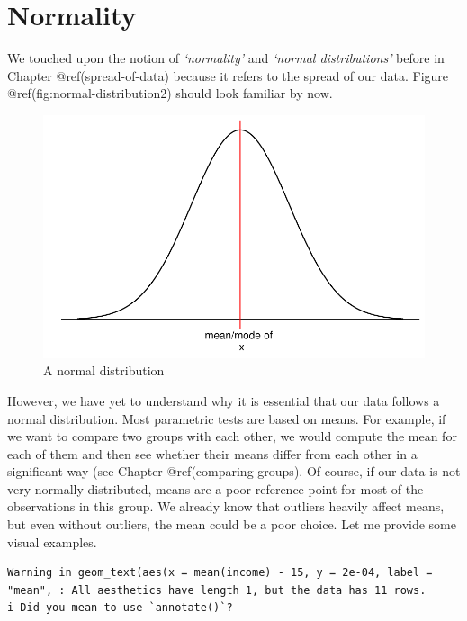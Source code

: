 \documentclass[
  letterpaper,
]{krantz}
\begin{document}
\section{Normality}\label{sec-normality}

We touched upon the notion of \emph{`normality'} and \emph{`normal
distributions'} before in Chapter @ref(spread-of-data) because it refers
to the spread of our data. Figure @ref(fig:normal-distribution2) should
look familiar by now.

\begin{figure}[H]

{\centering \includegraphics{09_sources_of_bias_files/figure-pdf/normal-distribution2-1.pdf}

}

\caption{A normal distribution}

\end{figure}%

However, we have yet to understand why it is essential that our data
follows a normal distribution. Most parametric tests are based on means.
For example, if we want to compare two groups with each other, we would
compute the mean for each of them and then see whether their means
differ from each other in a significant way (see Chapter
@ref(comparing-groups). Of course, if our data is not very normally
distributed, means are a poor reference point for most of the
observations in this group. We already know that outliers heavily affect
means, but even without outliers, the mean could be a poor choice. Let
me provide some visual examples.

\begin{verbatim}
Warning in geom_text(aes(x = mean(income) - 15, y = 2e-04, label = "mean", : All aesthetics have length 1, but the data has 11 rows.
i Did you mean to use `annotate()`?
\end{verbatim}
\end{document}
